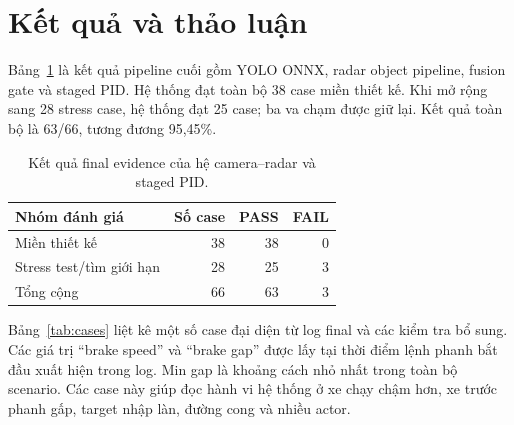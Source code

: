 \documentclass[conference]{IEEEtran}
\begin{document}
\section{Kết quả và thảo luận}
Bảng~\ref{tab:results} là kết quả pipeline cuối gồm YOLO ONNX, radar object pipeline, fusion gate và staged PID. Hệ thống đạt toàn bộ 38 case miền thiết kế. Khi mở rộng sang 28 stress case, hệ thống đạt 25 case; ba va chạm được giữ lại. Kết quả toàn bộ là 63/66, tương đương 95,45\%.

\begin{table}[t]
\caption{Kết quả final evidence của hệ camera--radar và staged PID.}
\label{tab:results}
\centering
\footnotesize
\begin{tabular}{lrrr}
\toprule
Nhóm đánh giá & Số case & PASS & FAIL \\
\midrule
Miền thiết kế & 38 & 38 & 0 \\
Stress test/tìm giới hạn & 28 & 25 & 3 \\
\midrule
Tổng cộng & 66 & 63 & 3 \\
\bottomrule
\end{tabular}
\end{table}

Bảng~\ref{tab:cases} liệt kê một số case đại diện từ log final và các kiểm tra bổ sung. Các giá trị ``brake speed'' và ``brake gap'' được lấy tại thời điểm lệnh phanh bắt đầu xuất hiện trong log. Min gap là khoảng cách nhỏ nhất trong toàn bộ scenario. Các case này giúp đọc hành vi hệ thống ở xe chạy chậm hơn, xe trước phanh gấp, target nhập làn, đường cong và nhiều actor.
\end{document}
